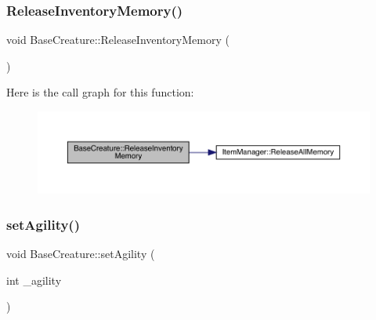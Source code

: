 \mbox{\label{class_base_creature_abaee8f951832751222a3f61c4faefd9d}} 
\subsubsection{\texorpdfstring{Release\+Inventory\+Memory()}{ReleaseInventoryMemory()}}
{\footnotesize\ttfamily void Base\+Creature\+::\+Release\+Inventory\+Memory (\begin{DoxyParamCaption}{ }\end{DoxyParamCaption})}

Here is the call graph for this function\+:
\nopagebreak
\begin{figure}[H]
\begin{center}
\leavevmode
\includegraphics[width=350pt]{d2/d3b/class_base_creature_abaee8f951832751222a3f61c4faefd9d_cgraph}
\end{center}
\end{figure}
\mbox{\label{class_base_creature_ad6357a6d4456d0b669abd1675efcca30}} 
\subsubsection{\texorpdfstring{set\+Agility()}{setAgility()}}
{\footnotesize\ttfamily void Base\+Creature\+::set\+Agility (\begin{DoxyParamCaption}\item[{int}]{\+\_\+agility }\end{DoxyParamCaption})}

\mbox{\label{class_base_creature_ad43564c6907562a3968ddc34a4d332a4}} 
